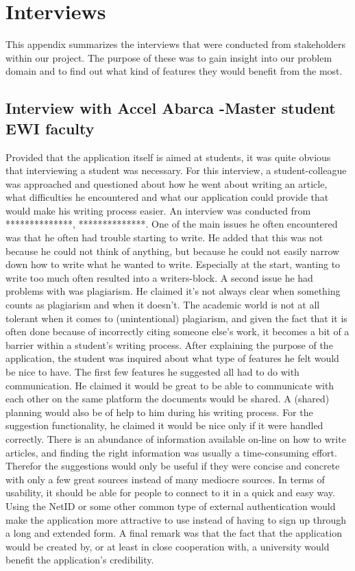 \chapter{Interviews}   
\label{interview} 
 This appendix summarizes the interviews that were conducted from stakeholders within our project. The purpose of these was to gain insight into our problem domain and to find out what kind of features they would benefit from the most.

\section{Interview with Accel Abarca -Master student EWI faculty}
Provided that the application itself is aimed at students, it was quite obvious that interviewing a student was necessary. For this interview, a student-colleague was approached and questioned about how he went about writing an article, what difficulties he encountered and what our application could provide that would make his writing process easier. An interview was conducted from **************, **************.
One of the main issues he often encountered was that he often had trouble starting to write. He added that this was not because he could not think of anything, but because he could not easily narrow down how to write what he wanted to write. Especially at the start, wanting to write too much often resulted into a writers-block.
A second issue he had problems with was plagiarism. He claimed it's not always clear when something counts as plagiarism and when it doesn't. The academic world is not at all tolerant when it comes to (unintentional) plagiarism, and given the fact that it is often done because of incorrectly citing someone else's work, it becomes a bit of a barrier within a student's writing process.
After explaining the purpose of the application, the student was inquired about what type of features he felt would be nice to have. The first few features he suggested all had to do with communication. He claimed it would be great to be able to communicate with each other on the same platform the documents would be shared. A (shared) planning would also be of help to him during his writing process. For the suggestion functionality, he claimed it would be nice only if it were handled correctly. There is an abundance of information available on-line on how to write articles, and finding the right information was usually a time-consuming effort. Therefor the suggestions would only be useful if they were concise and concrete with only a few great sources instead of many mediocre sources. 
In terms of usability, it should be able for people to connect to it in a quick and easy way. Using the NetID or some other common type of external authentication would make the application more attractive to use instead of having to sign up through a long and extended form. A final remark was that the fact that the application would be created by, or at least in close cooperation with, a university would benefit the application's credibility.

